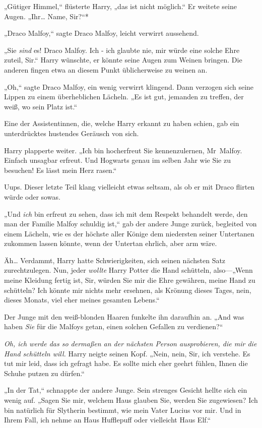 {„Gütiger Himmel,“ flüsterte Harry, „das ist nicht möglich.“ Er weitete seine Augen. „Ihr… Name, Sir?“*

„Draco Malfoy,“ sagte Draco Malfoy, leicht verwirrt aussehend.

„Sie \emph{sind} es! Draco Malfoy. Ich - ich glaubte nie, mir würde eine solche Ehre zuteil, Sir.“ Harry wünschte, er könnte seine Augen zum Weinen bringen. Die anderen fingen etwa an diesem Punkt üblicherweise zu weinen an.

„Oh,“ sagte Draco Malfoy, ein wenig verwirrt klingend. Dann verzogen sich seine Lippen zu einem überheblichen Lächeln. „Es ist gut, jemanden zu treffen, der weiß, wo sein Platz ist.“

Eine der Assistentinnen, die, welche Harry erkannt zu haben schien, gab ein unterdrücktes hustendes Geräusch von sich.

Harry plapperte weiter. „Ich bin hocherfreut Sie kennenzulernen, Mr~Malfoy. Einfach unsagbar erfreut. Und Hogwarts genau im selben Jahr wie Sie zu besuchen! Es lässt mein Herz rasen.“

Uups. Dieser letzte Teil klang vielleicht etwas seltsam, als ob er mit Draco flirten würde oder sowas.

„Und \emph{ich} bin erfreut zu sehen, dass ich mit dem Respekt behandelt werde, den man der Familie Malfoy schuldig ist,“ gab der andere Junge zurück, begleited von einem Lächeln, wie es der höchste aller Könige dem niedersten seiner Untertanen zukommen lassen könnte, wenn der Untertan ehrlich, aber arm wäre.

Äh… Verdammt, Harry hatte Schwierigkeiten, sich seinen nächsten Satz zurechtzulegen. Nun, jeder \emph{wollte} Harry Potter die Hand schütteln, also—„Wenn meine Kleidung fertig ist, Sir, würden Sie mir die Ehre gewähren, meine Hand zu schütteln? Ich könnte mir nichts mehr ersehnen, als Krönung dieses Tages, nein, dieses Monats, viel eher meines gesamten Lebens.“

Der Junge mit den weiß-blonden Haaren funkelte ihn daraufhin an. „And was haben \emph{Sie} für die Malfoys getan, einen solchen Gefallen zu verdienen?“

\emph{Oh, ich werde das so dermaßen an der nächsten Person ausprobieren, die mir die Hand schütteln will.} Harry neigte seinen Kopf. „Nein, nein, Sir, ich verstehe. Es tut mir leid, dass ich gefragt habe. Es sollte mich eher geehrt fühlen, Ihnen die Schuhe putzen zu dürfen.“

„In der Tat,“ schnappte der andere Junge. Sein strenges Gesicht hellte sich ein wenig auf. „Sagen Sie mir, welchem Haus glauben Sie, werden Sie zugewiesen? Ich bin natürlich für Slytherin bestimmt, wie mein Vater Lucius vor mir. Und in Ihrem Fall, ich nehme an Haus Hufflepuff oder vielleicht Haus Elf.“

}
